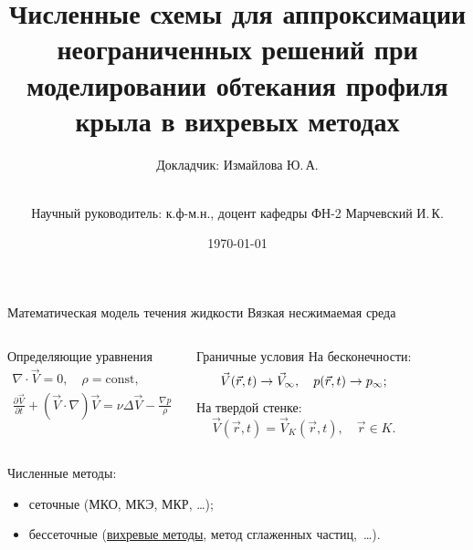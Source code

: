 \documentclass[ignoreonframetext,unicode]{beamer}
\title[Численные схемы...]{Численные схемы для аппроксимации неограниченных решений при моделировании обтекания профиля крыла в вихревых методах}
\author[Измайлова Ю.\,А.]{Докладчик: Измайлова Ю.\,А.\and\\[0.5mm] Научный руководитель: к.ф-м.н., доцент кафедры ФН-2 Марчевский И.\,К.}
\institute[каф. Прикладная математика ФН-2]{группа ФН2-61Б}
\date{\today}
\begin{document}
	
	\begin{frame}[plain]
		\maketitle
	\end{frame}
	
	\begin{frame}{Математическая модель течения жидкости}
	 Вязкая несжимаемая среда
		\begin{columns}
			\vspace*{-2.0mm}
			\begin{block}{Определяющие уравнения}\vspace*{-3.5mm}
			\begin{gather*}
				\nabla\cdot\vec{V}=0,\quad \rho=\mathrm{const},\\
				\frac{\partial \vec{V}}{\partial t} + (\vec{V}\cdot\nabla)\vec{V}=\nu\Delta\vec{V}-\frac{\nabla p}{\rho}
			\end{gather*}
			\end{block}
			\begin{block}{Граничные условия}
				На бесконечности:\vspace*{-2.0mm}
				\[
					\vec{V}(\vec r, t)\to \vec V_{\infty}, \quad p(\vec r, t)\to p_{\infty};\vspace*{-2.0mm}
				\]
				На твердой стенке:\vspace*{-2.0mm}
				\[
				\vec{V}(\vec r, t)=\vec V_K(\vec r,t),\quad \vec r\in K.
				\]
			\end{block}
		\end{columns}
			Численные методы:
			\begin{itemize}
				\item сеточные (МКО, МКЭ, МКР, \ldots);
				\item бессеточные (\underline{вихревые методы}, метод сглаженных частиц,~\ldots).
			\end{itemize}
		
		
	\end{frame}
\end{document}
